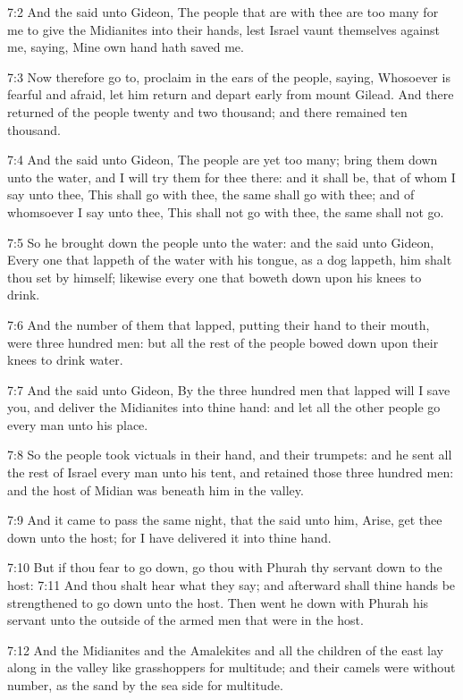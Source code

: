 7:2 And the \LORD said unto Gideon, The people that are with thee are too many for me to give the Midianites into their hands, lest Israel vaunt themselves against me, saying, Mine own hand hath saved me.

7:3 Now therefore go to, proclaim in the ears of the people, saying, Whosoever is fearful and afraid, let him return and depart early from mount Gilead. And there returned of the people twenty and two thousand; and there remained ten thousand.

7:4 And the \LORD said unto Gideon, The people are yet too many; bring them down unto the water, and I will try them for thee there: and it shall be, that of whom I say unto thee, This shall go with thee, the same shall go with thee; and of whomsoever I say unto thee, This shall not go with thee, the same shall not go.

7:5 So he brought down the people unto the water: and the \LORD said unto Gideon, Every one that lappeth of the water with his tongue, as a dog lappeth, him shalt thou set by himself; likewise every one that boweth down upon his knees to drink.

7:6 And the number of them that lapped, putting their hand to their mouth, were three hundred men: but all the rest of the people bowed down upon their knees to drink water.

7:7 And the \LORD said unto Gideon, By the three hundred men that lapped will I save you, and deliver the Midianites into thine hand: and let all the other people go every man unto his place.

7:8 So the people took victuals in their hand, and their trumpets: and he sent all the rest of Israel every man unto his tent, and retained those three hundred men: and the host of Midian was beneath him in the valley.

7:9 And it came to pass the same night, that the \LORD said unto him, Arise, get thee down unto the host; for I have delivered it into thine hand.

7:10 But if thou fear to go down, go thou with Phurah thy servant down to the host: 7:11 And thou shalt hear what they say; and afterward shall thine hands be strengthened to go down unto the host. Then went he down with Phurah his servant unto the outside of the armed men that were in the host.

7:12 And the Midianites and the Amalekites and all the children of the east lay along in the valley like grasshoppers for multitude; and their camels were without number, as the sand by the sea side for multitude.

